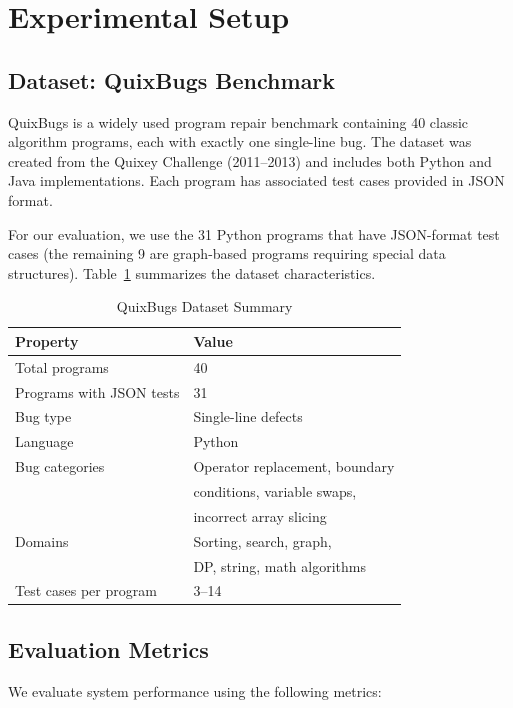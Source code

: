 \documentclass[conference]{IEEEtran}
\begin{document}
\section{Experimental Setup}

\subsection{Dataset: QuixBugs Benchmark}
QuixBugs \cite{quixbugs} is a widely used program repair benchmark containing 40 classic algorithm programs, each with exactly one single-line bug. The dataset was created from the Quixey Challenge (2011--2013) and includes both Python and Java implementations. Each program has associated test cases provided in JSON format.

For our evaluation, we use the 31 Python programs that have JSON-format test cases (the remaining 9 are graph-based programs requiring special data structures). Table~\ref{tab:dataset} summarizes the dataset characteristics.

\begin{table}[htbp]
\caption{QuixBugs Dataset Summary}
\label{tab:dataset}
\centering
\begin{tabular}{ll}
\toprule
\textbf{Property} & \textbf{Value} \\
\midrule
Total programs & 40 \\
Programs with JSON tests & 31 \\
Bug type & Single-line defects \\
Language & Python \\
Bug categories & Operator replacement, boundary\\
 & conditions, variable swaps,\\
 & incorrect array slicing \\
Domains & Sorting, search, graph,\\
 & DP, string, math algorithms \\
Test cases per program & 3--14 \\
\bottomrule
\end{tabular}
\end{table}

\subsection{Evaluation Metrics}
We evaluate system performance using the following metrics:
\end{document}
